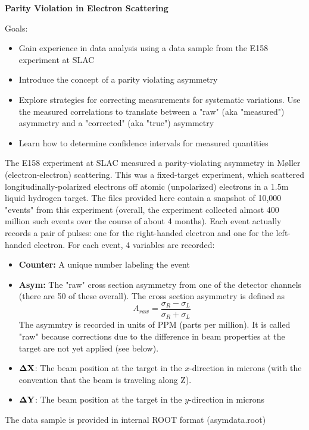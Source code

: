 \documentclass[12pt]{article}
\begin{document}
\begin{center}
  {\large\bf Parity Violation in Electron Scattering}
\end{center}
\vskip0.2in
Goals:
\begin{itemize}
\item Gain experience in data analysis using a data sample
  from the E158 experiment at SLAC
\item Introduce the concept of a parity violating asymmetry
\item Explore strategies for correcting measurements for systematic
  variations.
  Use the measured correlations to translate between a "raw" (aka "measured") asymmetry and a "corrected"
  (aka "true") asymmetry
\item Learn how to determine confidence intervals for measured quantities
\end{itemize}
The E158  experiment at SLAC measured a parity-violating asymmetry in
M\o ller (electron-electron) scattering. This was a fixed-target experiment,
which scattered longitudinally-polarized electrons off atomic (unpolarized)
electrons in a 1.5m liquid hydrogen target. The files provided
here contain a
snapshot of 10,000 "events" from this experiment (overall, the experiment
collected almost 400 million such events over the course of about 4 months).
Each event actually records a pair of pulses: one for the right-handed electron
and one for the left-handed electron. For each event, 4 variables are recorded:
\begin{itemize}
    \item{\bf Counter:} A unique number labeling the event
    \item{\bf Asym:} The "raw" cross section asymmetry from one of the
      detector channels (there are 50 of these overall). The cross section
      asymmetry is defined as
      $$
      A_{raw} = \frac{\sigma_R -\sigma_L}{\sigma_R +\sigma_L}
      $$
      The asymmtry is recorded in units of PPM (parts per million). It is
      called "raw" because corrections due to the difference in beam properties
      at the target are not yet applied (see below).
    \item{$\bf \Delta X$:}  The beam position at the target in the $x$-direction
      in microns (with the convention that the beam is traveling along Z).
    \item{$\bf \Delta Y$:} The beam position at the target in the $y$-direction in microns 
\end{itemize}
The data sample is provided in internal ROOT format (asymdata.root)
\end{document}
